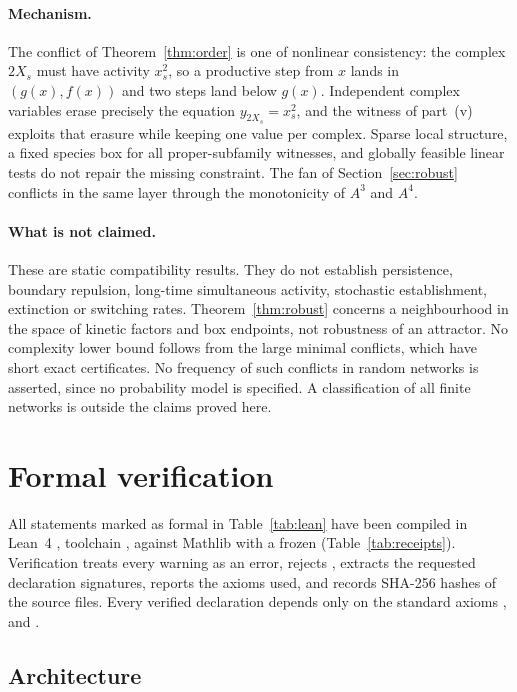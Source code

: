 \documentclass[11pt,a4paper]{article}
\theoremstyle{plain}
\theoremstyle{definition}
\theoremstyle{remark}
\begin{document}
\paragraph{Mechanism.} The conflict of Theorem~\ref{thm:order} is one of nonlinear consistency: the complex $2X_s$ must have activity $x_s^2$, so a productive step from $x$ lands in $(g(x),f(x))$ and two steps land below $g(x)$. Independent complex variables erase precisely the equation $y_{2X_s}=x_s^2$, and the witness of part~(v) exploits that erasure while keeping one value per complex. Sparse local structure, a fixed species box for all proper-subfamily witnesses, and globally feasible linear tests do not repair the missing constraint. The fan of Section~\ref{sec:robust} conflicts in the same layer through the monotonicity of $A^3$ and $A^4$.

\paragraph{What is not claimed.} These are static compatibility results. They do not establish persistence, boundary repulsion, long-time simultaneous activity, stochastic establishment, extinction or switching rates. Theorem~\ref{thm:robust} concerns a neighbourhood in the space of kinetic factors and box endpoints, not robustness of an attractor. No complexity lower bound follows from the large minimal conflicts, which have short exact certificates. No frequency of such conflicts in random networks is asserted, since no probability model is specified. A classification of all finite networks is outside the claims proved here.

\section{Formal verification}\label{sec:formal}

All statements marked as formal in Table~\ref{tab:lean} have been compiled in Lean~4 \citep{demoura2021}, toolchain , against Mathlib \citep{mathlib2020} with a frozen  (Table~\ref{tab:receipts}). Verification treats every warning as an error, rejects , extracts the requested declaration signatures, reports the axioms used, and records SHA-256 hashes of the source files. Every verified declaration depends only on the standard axioms ,  and .

\subsection{Architecture}
\end{document}
